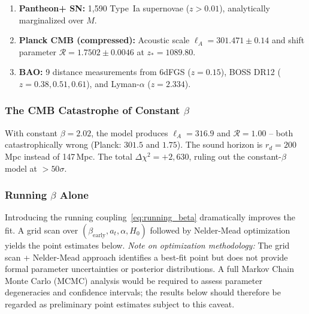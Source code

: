 \documentclass[aps,prd,twocolumn,superscriptaddress,nofootinbib]{revtex4-2}
\begin{document}
\begin{enumerate}
\item \textbf{Pantheon+ SN:} 1,590 Type~Ia supernovae ($z > 0.01$), analytically marginalized over $M$.
\item \textbf{Planck CMB (compressed):} Acoustic scale $\ell_A = 301.471 \pm 0.14$ and shift parameter $\mathcal{R} = 1.7502 \pm 0.0046$ at $z_* = 1089.80$.
\item \textbf{BAO:} 9 distance measurements from 6dFGS ($z = 0.15$), BOSS DR12 ($z = 0.38, 0.51, 0.61$), and Lyman-$\alpha$ ($z = 2.334$).
\end{enumerate}

\subsubsection{The CMB Catastrophe of Constant $\beta$}

With constant $\beta = 2.02$, the model produces $\ell_A = 316.9$ and $\mathcal{R} = 1.00$ -- both catastrophically wrong (Planck: $301.5$ and $1.75$). The sound horizon is $r_d = 200$\,Mpc instead of 147\,Mpc. The total $\Delta\chi^2 = +2{,}630$, ruling out the constant-$\beta$ model at $>50\sigma$.

\subsubsection{Running $\beta$ Alone}

Introducing the running coupling~\eqref{eq:running_beta} dramatically improves the fit. A grid scan over $(\beta_{\mathrm{early}}, a_t, \alpha, H_0)$ followed by Nelder-Mead optimization yields the point estimates below. \textit{Note on optimization methodology:} The grid scan + Nelder-Mead approach identifies a best-fit point but does not provide formal parameter uncertainties or posterior distributions. A full Markov Chain Monte Carlo (MCMC) analysis would be required to assess parameter degeneracies and confidence intervals; the results below should therefore be regarded as preliminary point estimates subject to this caveat.
\end{document}
